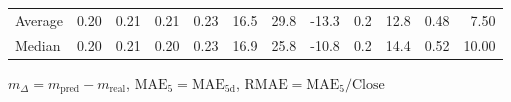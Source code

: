 \begin{threeparttable}
{\begin{tabular}{lrrrrrrrrrrr}
Average &          0.20 &          0.21 &          0.21 &        0.23 &                16.5 &                29.8 &      -13.3 &                 0.2 &             12.8 &            0.48 &                   7.50 \\
 Median &          0.20 &          0.21 &          0.20 &        0.23 &                16.9 &                25.8 &      -10.8 &                 0.2 &             14.4 &            0.52 &                  10.00 \\
\bottomrule
\end{tabular}
}
\begin{tablenotes}\footnotesize
\item $m_\Delta=m_{\text{pred}}-m_{\text{real}}$,
$\mathrm{MAE}_5=\mathrm{MAE}_{5\text{d}}$,
$\mathrm{RMAE}=\mathrm{MAE}_5/\text{Close}$
\end{tablenotes}
\end{threeparttable}
\endgroup

